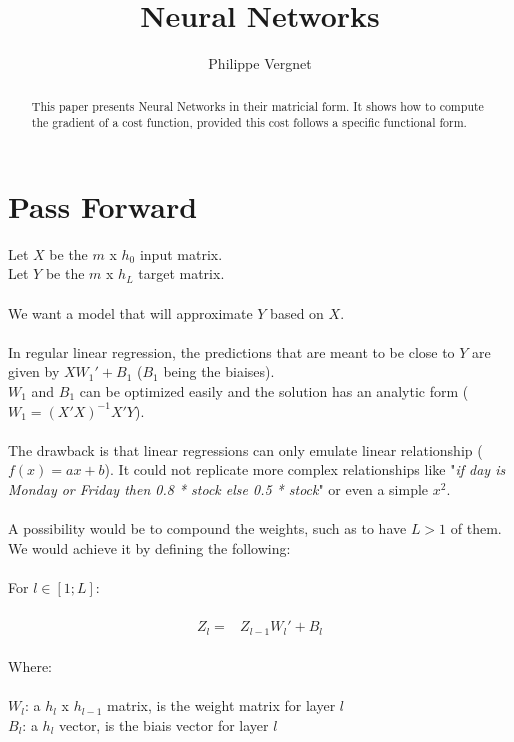 \documentclass[]{article}
\title{Neural Networks}
\author{Philippe Vergnet}
\begin{document}
\allowdisplaybreaks


\maketitle

\begin{abstract}
This paper presents Neural Networks in their matricial form. It shows how to compute the gradient of a cost function, provided this cost follows a specific functional form.
\end{abstract}

\section{Pass Forward}

Let $X$ be the $m$ x $h_0$ input matrix.\\
Let $Y$ be the $m$ x $h_L$ target matrix.\\
\\
We want a model that will approximate $Y$ based on $X$.\\
\\
In regular linear regression, the predictions that are meant to be close to $Y$ are given by  $XW_1'+B_1$ ($B_1$ being the biaises).\\
$W_1$ and $B_1$ can be optimized easily and the solution has an analytic form ($W_1=(X'X)^{-1}X'Y$).\\
\\
The drawback is that linear regressions can only emulate linear relationship ($f(x)=ax+b$). It could not replicate more complex relationships like "{\it if day is Monday or Friday then 0.8 * stock else 0.5 * stock}" or even a simple $x^2$.\\
\\
A possibility would be to compound the weights, such as to have $L>1$ of them.\\
We would achieve it by defining the following:\\
\\
For $l \in [1;L]$:\\
\\
\begin{align*}
Z_l=&Z_{l-1}W_{l}'+B_{l}
\end{align*}
\\
Where:\\
\\
$W_l$: a $h_l$ x $h_{l-1}$ matrix, is the weight matrix for layer $l$\\
$B_l$: a $h_l$ vector, is the biais vector for layer $l$\\
\end{document}
